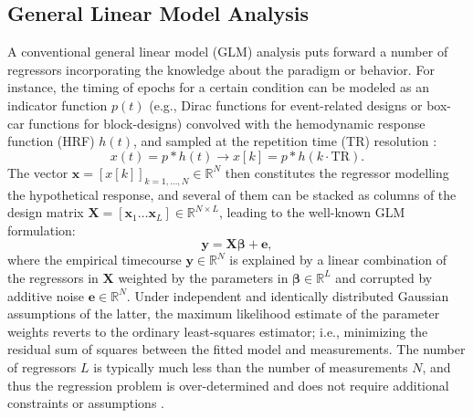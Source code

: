 \subsection{General Linear Model Analysis}

A conventional general linear model (GLM) analysis puts forward a number of
regressors incorporating the knowledge about the paradigm or behavior. For
instance, the timing of epochs for a certain condition can be modeled as an
indicator function $p(t)$ (e.g., Dirac functions for event-related designs or
box-car functions for block-designs) convolved with the hemodynamic response
function (HRF) $h(t)$, and sampled at the repetition time (TR) resolution
\citep{Friston1994AnalysisfunctionalMRI,Friston1998EventRelatedfMRI,
Boynton1996LinearSystemsAnalysis,Cohen1997ParametricAnalysisfMRI}:
$$
   x(t) = p*h(t) \rightarrow x[k] = p*h(k\cdot\text{TR}).
$$
The vector $\mathbf{x}=[x[k]]_{k=1,\ldots,N} \in \mathbb{R}^{N}$ then
constitutes the regressor modelling the hypothetical response, and several of
them can be stacked as columns of the design matrix $\mathbf{X}=[\mathbf{x}_1
\ldots \mathbf{x}_L] \in \mathbb{R}^{N \times L}$, leading to the well-known GLM
formulation:
\begin{equation}
    \label{eq:glm}
    \mathbf{y} = \mathbf{X} \boldsymbol\beta + \mathbf{e},
\end{equation}
where the empirical timecourse $\mathbf{y} \in \mathbb{R}^{N}$ is explained by a
linear combination of the regressors in $\mathbf{X}$ weighted by the parameters
in $\boldsymbol\beta \in \mathbb{R}^{L}$ and corrupted by additive noise
$\mathbf{e}\in \mathbb{R}^{N}$. Under independent and identically distributed
Gaussian assumptions of the latter, the maximum likelihood estimate of the
parameter weights reverts to the ordinary least-squares estimator; i.e.,
minimizing the residual sum of squares between the fitted model and
measurements. The number of regressors $L$ is typically much less than the
number of measurements $N$, and thus the regression problem is over-determined
and does not require additional constraints or assumptions
\citep{Henson2007CHAPTER14Convolution}.

